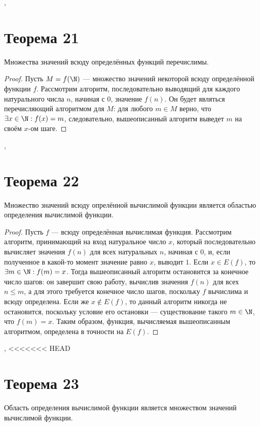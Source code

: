 \documentclass[a4paper,12pt]{article}
\begin{document}
    \sep
    
    \section {Теорема 21}
    \begin{theorem}
    Множества значений всюду определённых функций перечислимы.
    \end{theorem}
    \begin{proof} 
    Пусть $M=f(\N)$ --- множество значений некоторой всюду определённой функции $f$. Рассмотрим алгоритм, последовательно выводящий для каждого натурального числа $n$, начиная с $0$, значение $f(n)$. Он будет являться перечисляющий алгоритмом для $M$: для любого $m\in M$ верно, что $\exists x \in \N : f(x) = m$, следовательно, вышеописанный алгоритм выведет $m$ на своём $x$-ом шаге.
    \end{proof}
	
	\sep
    
    \section {Теорема 22}
    \begin{theorem}
    Множество значений всюду опрелённой вычислимой функции является областью определения вычислимой функции.
    \end{theorem} 
    \begin{proof} Пусть $f$ --- всюду определённая вычислимая функция. Рассмотрим алгоритм, принимающий на вход натуральное число $x$, который последовательно вычисляет значения $f(n)$ для всех натуральных $n$, начиная с $0$, и, если полученное в какой-то момент значение равно $x$, выводит $1$. Если $x\in E(f)$, то $\exists m \in \N : f(m) = x$. Тогда вышеописанный алгоритм остановится за конечное число шагов: он завершит свою работу, вычислив значения $f(n)$ для всех $n\leqslant m$, а для этого требуется конечное число шагов, поскольку $f$ вычислима и всюду определена. Если же $x\not\in E(f)$, то данный алгоритм никогда не остановится, поскольку условие его остановки --- существование такого $m\in\N$, что $f(m)=x$. Таким образом, функция, вычисляемая вышеописанным алгоритмом, определена в точности на $E(f)$.
    \end{proof}
	
	\sep
<<<<<<< HEAD
    \section {Теорема 23}
    \begin{theorem}
        Область определения вычислимой функции является множеством значений вычислимой функции.
    \end{theorem}
    
\end{document}

